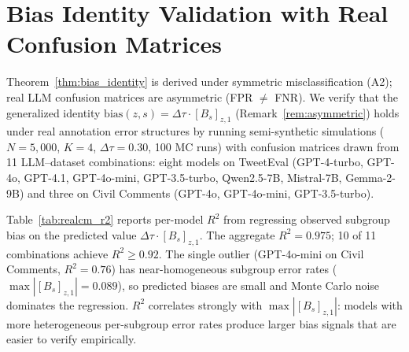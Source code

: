 \begin{table}[h]
\centering
\caption{Per-subgroup misclassification rates on Civil Comments ($K{=}4$). $\Delta$ denotes max $-$ min across subgroups.}
\label{tab:civil_cm}
\small
{}
\end{table}

\section{Bias Identity Validation with Real Confusion Matrices}
\label{app:realcm_bias}

Theorem~\ref{thm:bias_identity} is derived under symmetric misclassification (A2); real LLM confusion matrices are asymmetric (FPR $\neq$ FNR).
We verify that the generalized identity $\mathrm{bias}(z,s) = \Delta\tau \cdot [B_s]_{z,1}$ (Remark~\ref{rem:asymmetric}) holds under real annotation error structures by running semi-synthetic simulations ($N{=}5{,}000$, $K{=}4$, $\Delta\tau{=}0.30$, 100 MC runs) with confusion matrices drawn from 11 LLM--dataset combinations: eight models on TweetEval (GPT-4-turbo, GPT-4o, GPT-4.1, GPT-4o-mini, GPT-3.5-turbo, Qwen2.5-7B, Mistral-7B, Gemma-2-9B) and three on Civil Comments (GPT-4o, GPT-4o-mini, GPT-3.5-turbo).

Table~\ref{tab:realcm_r2} reports per-model $R^2$ from regressing observed subgroup bias on the predicted value $\Delta\tau \cdot [B_s]_{z,1}$.
The aggregate $R^2 = 0.975$; 10 of 11 combinations achieve $R^2 \geq 0.92$.
The single outlier (GPT-4o-mini on Civil Comments, $R^2{=}0.76$) has near-homogeneous subgroup error rates ($\max|[B_s]_{z,1}| = 0.089$), so predicted biases are small and Monte Carlo noise dominates the regression.
$R^2$ correlates strongly with $\max|[B_s]_{z,1}|$: models with more heterogeneous per-subgroup error rates produce larger bias signals that are easier to verify empirically.

